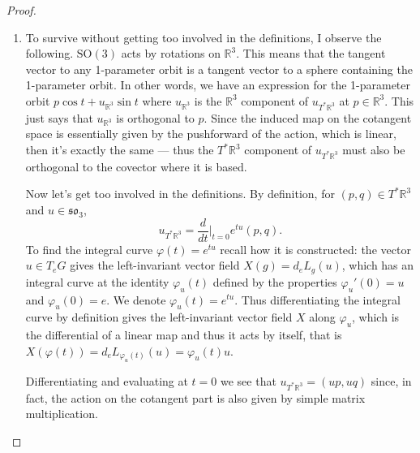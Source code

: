\begin{proof}
\begin{enumerate}
\item To survive without getting too
involved in the definitions, I observe
the following. $\text{SO}(3)$ acts
by rotations on $\mathbb{R}^3$.
This means that the tangent vector
to any 1-parameter orbit is a tangent
vector to a sphere containing the
1-parameter orbit.
In other words, we have an expression
for the 1-parameter orbit
$p \cos t + u_{\mathbb{R}^3} \sin t$
where $u_{\mathbb{R}^3}$
is the $\mathbb{R}^3$ component
of $u_{T^*\mathbb{R}^3}$ at
$p \in \mathbb{R}^3$.
This just says that $u_{\mathbb{R}^3}$
is orthogonal to $p$.
Since the induced map on the cotangent
space is essentially given by the
pushforward of the action, which is linear,
then it's exactly the same ---
thus the $T^*\mathbb{R}^3$
component of $u_{T^*\mathbb{R}^3}$
must also be orthogonal to
the covector where it is based.

Now let's get too involved in the
definitions.
By definition, for
$(p,q) \in T^*\mathbb{R}^3$
and $u \in \mathfrak{so}_3$,
$$
u_{T^*\mathbb{R}^3}
=\frac{d}{dt}\Big|_{t=0}
e^{tu}(p,q).
$$
To find the integral curve $\varphi(t)
=e^{tu}$ recall how it is constructed:
the vector $u \in T_e G$
gives the left-invariant vector field
$X(g)=d_eL_g(u)$, which
has an integral curve at the identity
$\varphi_u(t)$ defined by the properties
$\varphi_u'(0)=u$ and $\varphi_u(0)=e$.
We denote $\varphi_u(t)=e^{tu}$.
Thus differentiating the integral
curve by definition gives
the left-invariant vector field $X$
along $\varphi_u$,
which is the differential of a linear
map and thus it acts by itself,
that is $X(\varphi(t))
=d_eL_{\varphi_u(t)}(u)
=\varphi_u(t)u$.

Differentiating and evaluating at $t=0$
we see that $u_{T^*\mathbb{R}^3}
=(up,uq)$
since, in fact, the action on the
cotangent part is also given by
simple matrix multiplication.


\end{enumerate}
\end{proof}
